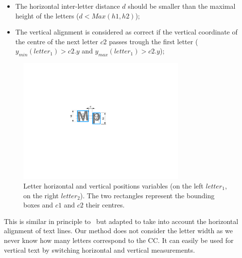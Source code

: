 \begin{itemize}
    \item The horizontal inter-letter distance $d$ should be smaller than the maximal height of the letters ($d<Max(h1,h2)$);
    \item The vertical alignment is considered as correct if the vertical coordinate of the centre of the next letter $c2$ passes trough the first letter ($y_{min}(letter_1)>c2.y$ and $y_{max}(letter_1)>c2.y$);
\end{itemize}


	\begin{figure}[h!]	%
	  \centering
		\includegraphics[trim= 200px 280px 300px 220px, clip, width=0.75\textwidth]{letter_position.pdf}
		\caption{Letter horizontal and vertical positions variables (on the left $letter_1$, on the right $letter_2$). The two rectangles represent the bounding boxes and $c1$ and $c2$ their centres.}
		\label{fig:se:se:letter_position}
	\end{figure}


 This is similar in principle to~\cite{Clavelli09} but adapted to take into account the horizontal alignment of text lines. Our method does not consider the letter width as we never know how many letters correspond to the CC.
 It can easily be used for vertical text by switching horizontal and vertical measurements.






